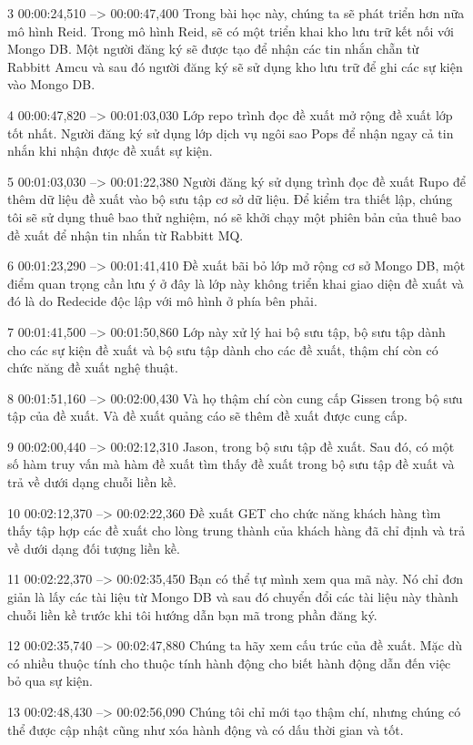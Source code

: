 3
00:00:24,510 --> 00:00:47,400
Trong bài học này, chúng ta sẽ phát triển hơn nữa mô hình Reid.  Trong mô hình Reid, sẽ có một triển khai kho lưu trữ kết nối với Mongo DB. Một người đăng ký sẽ được tạo để nhận các tin nhắn chẵn từ Rabbitt Amcu và sau đó người đăng ký sẽ sử dụng kho lưu trữ để ghi các sự kiện vào Mongo DB.

4
00:00:47,820 --> 00:01:03,030
Lớp repo trình đọc đề xuất mở rộng đề xuất lớp tốt nhất.  Người đăng ký sử dụng lớp dịch vụ ngôi sao Pops để nhận ngay cả tin nhắn khi nhận được đề xuất sự kiện.

5
00:01:03,030 --> 00:01:22,380
Người đăng ký sử dụng trình đọc đề xuất Rupo để thêm dữ liệu đề xuất vào bộ sưu tập cơ sở dữ liệu.  Để kiểm tra thiết lập, chúng tôi sẽ sử dụng thuê bao thử nghiệm, nó sẽ khởi chạy một phiên bản của thuê bao đề xuất để nhận tin nhắn từ Rabbitt MQ.

6
00:01:23,290 --> 00:01:41,410
Đề xuất bãi bỏ lớp mở rộng cơ sở Mongo DB, một điểm quan trọng cần lưu ý ở đây là lớp này không triển khai giao diện đề xuất và đó là do Redecide độc ​​lập với mô hình ở phía bên phải.

7
00:01:41,500 --> 00:01:50,860
Lớp này xử lý hai bộ sưu tập, bộ sưu tập dành cho các sự kiện đề xuất và bộ sưu tập dành cho các đề xuất, thậm chí còn có chức năng đề xuất nghệ thuật.

8
00:01:51,160 --> 00:02:00,430
Và họ thậm chí còn cung cấp Gissen trong bộ sưu tập của đề xuất.  Và đề xuất quảng cáo sẽ thêm đề xuất được cung cấp.

9
00:02:00,440 --> 00:02:12,310
Jason, trong bộ sưu tập đề xuất.  Sau đó, có một số hàm truy vấn mà hàm đề xuất tìm thấy đề xuất trong bộ sưu tập đề xuất và trả về dưới dạng chuỗi liền kề.

10
00:02:12,370 --> 00:02:22,360
Đề xuất GET cho chức năng khách hàng tìm thấy tập hợp các đề xuất cho lòng trung thành của khách hàng đã chỉ định và trả về dưới dạng đối tượng liền kề.

11
00:02:22,370 --> 00:02:35,450
Bạn có thể tự mình xem qua mã này.  Nó chỉ đơn giản là lấy các tài liệu từ Mongo DB và sau đó chuyển đổi các tài liệu này thành chuỗi liền kề trước khi tôi hướng dẫn bạn mã trong phần đăng ký.

12
00:02:35,740 --> 00:02:47,880
Chúng ta hãy xem cấu trúc của đề xuất.  Mặc dù có nhiều thuộc tính cho thuộc tính hành động cho biết hành động dẫn đến việc bỏ qua sự kiện.

13
00:02:48,430 --> 00:02:56,090
Chúng tôi chỉ mới tạo thậm chí, nhưng chúng có thể được cập nhật cũng như xóa hành động và có dấu thời gian và tốt.

